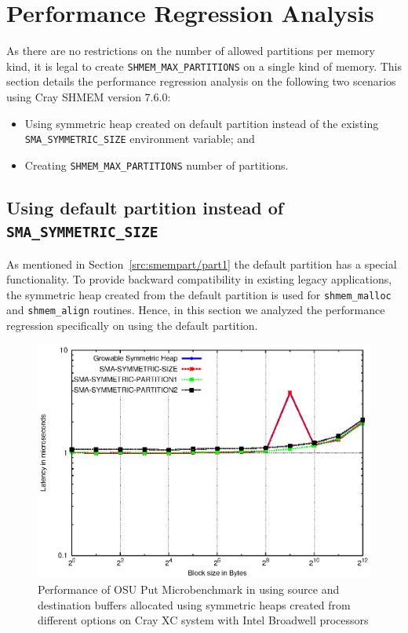\section{Performance Regression Analysis}
\label{src:regression}
As there are no restrictions on the number of allowed partitions per
memory kind, it is legal to create \texttt{SHMEM\_MAX\_PARTITIONS}
on a single kind of memory. This section details the performance
regression analysis on the following two scenarios using Cray SHMEM
version 7.6.0:
\begin{itemize}
    \item Using symmetric heap created on default partition instead of
    the existing \texttt{SMA\_SYMMETRIC\_SIZE} environment variable; and
    \item Creating \texttt{SHMEM\_MAX\_PARTITIONS} number of partitions.
\end{itemize}

\subsection{Using default partition instead of
\texttt{SMA\_SYMMETRIC\_SIZE}}
\label{src:regression/partition1}
As mentioned in Section~\ref{src:smempart/part1} the default partition
has a special functionality. To provide backward compatibility in
existing legacy applications, the symmetric heap created
from the default partition is used for \texttt{shmem\_malloc} and
\texttt{shmem\_align} routines. Hence, in this section we analyzed the
performance regression specifically on using the default partition.

\begin{figure}[ht!]
    \vspace{-20pt}
    \centering
    \includegraphics[width=\linewidth]{graph/partition1-bdw.eps}
    \caption{Performance of OSU Put Microbenchmark in using source and
    destination buffers allocated using symmetric heaps created from
    different options
    on Cray XC system with Intel Broadwell
    processors}
    \label{graph:partition1-bdw}
    \vspace{-15pt}
\end{figure}

